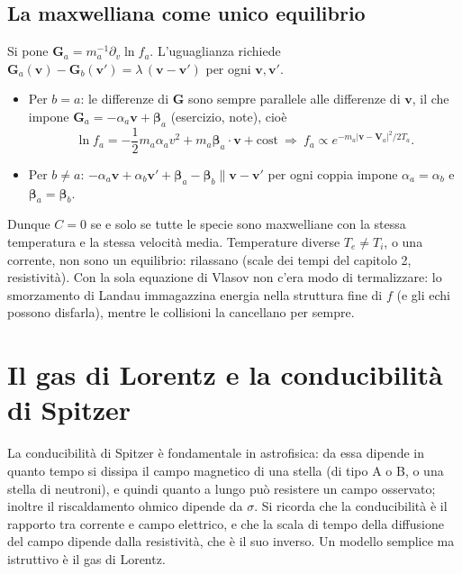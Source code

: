 \subsection{La maxwelliana come unico equilibrio}
Si pone $\mathbf{G}_a=m_a^{-1}\partial_v\ln f_a$. L'uguaglianza richiede $\mathbf{G}_a(\mathbf{v})-\mathbf{G}_b(\mathbf{v}')=\lambda\,(\mathbf{v}-\mathbf{v}')$ per ogni $\mathbf{v},\mathbf{v}'$.
\begin{itemize}
\item Per $b=a$: le differenze di $\mathbf{G}$ sono sempre parallele alle differenze di $\mathbf{v}$, il che impone $\mathbf{G}_a=-\alpha_a\mathbf{v}+\boldsymbol{\beta}_a$ (esercizio, note), cioè
\begin{equation}
\ln f_a=-\frac12m_a\alpha_av^2+m_a\boldsymbol{\beta}_a\cdot\mathbf{v}+\mathrm{cost}\ \Rightarrow\ f_a\propto e^{-m_a|\mathbf{v}-\mathbf{V}_a|^2/2T_a}.
\end{equation}
\item Per $b\neq a$: $-\alpha_a\mathbf{v}+\alpha_b\mathbf{v}'+\boldsymbol{\beta}_a-\boldsymbol{\beta}_b\parallel\mathbf{v}-\mathbf{v}'$ per ogni coppia impone $\alpha_a=\alpha_b$ e $\boldsymbol{\beta}_a=\boldsymbol{\beta}_b$.
\end{itemize}
Dunque $C=0$ se e solo se tutte le specie sono maxwelliane con la stessa temperatura e la stessa velocità media. Temperature diverse $T_e\neq T_i$, o una corrente, non sono un equilibrio: rilassano (scale dei tempi del capitolo 2, resistività). Con la sola equazione di Vlasov non c'era modo di termalizzare: lo smorzamento di Landau immagazzina energia nella struttura fine di $f$ (e gli echi possono disfarla), mentre le collisioni la cancellano per sempre.

\section{Il gas di Lorentz e la conducibilità di Spitzer}
La conducibilità di Spitzer è fondamentale in astrofisica: da essa dipende in quanto tempo si dissipa il campo magnetico di una stella (di tipo A o B, o una stella di neutroni), e quindi quanto a lungo può resistere un campo osservato; inoltre il riscaldamento ohmico dipende da $\sigma$. Si ricorda che la conducibilità è il rapporto tra corrente e campo elettrico, e che la scala di tempo della diffusione del campo dipende dalla resistività, che è il suo inverso. Un modello semplice ma istruttivo è il gas di Lorentz.

